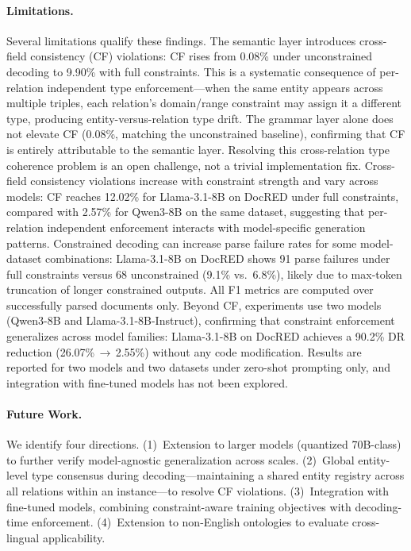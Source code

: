 \paragraph{Limitations.}\label{sec:limitations}
Several limitations qualify these findings.
The semantic layer introduces cross-field consistency (CF) violations: CF rises from 0.08\% under unconstrained decoding to 9.90\% with full constraints. %
This is a systematic consequence of per-relation independent type enforcement---when the same entity appears across multiple triples, each relation's domain/range constraint may assign it a different type, producing entity-versus-relation type drift.
The grammar layer alone does not elevate CF (0.08\%, matching the unconstrained baseline), confirming that CF is entirely attributable to the semantic layer. %
Resolving this cross-relation type coherence problem is an open challenge, not a trivial implementation fix.
Cross-field consistency violations increase with constraint strength and vary across models: CF reaches 12.02\% for Llama-3.1-8B on DocRED under full constraints, compared with 2.57\% for Qwen3-8B on the same dataset, suggesting that per-relation independent enforcement interacts with model-specific generation patterns. %
Constrained decoding can increase parse failure rates for some model-dataset combinations: Llama-3.1-8B on DocRED shows 91 parse failures under full constraints versus 68 unconstrained (9.1\% vs.\ 6.8\%), likely due to max-token truncation of longer constrained outputs. All F1 metrics are computed over successfully parsed documents only. %
Beyond CF, experiments use two models (Qwen3-8B and Llama-3.1-8B-Instruct), confirming that constraint enforcement generalizes across model families: Llama-3.1-8B on DocRED achieves a 90.2\% DR reduction (26.07\%\,$\to$\,2.55\%) without any code modification.
Results are reported for two models and two datasets under zero-shot prompting only, and integration with fine-tuned models has not been explored.

\paragraph{Future Work.}
We identify four directions.
(1)~Extension to larger models (quantized 70B-class) to further verify model-agnostic generalization across scales.
(2)~Global entity-level type consensus during decoding---maintaining a shared entity registry across all relations within an instance---to resolve CF violations.
(3)~Integration with fine-tuned models, combining constraint-aware training objectives with decoding-time enforcement.
(4)~Extension to non-English ontologies to evaluate cross-lingual applicability.
